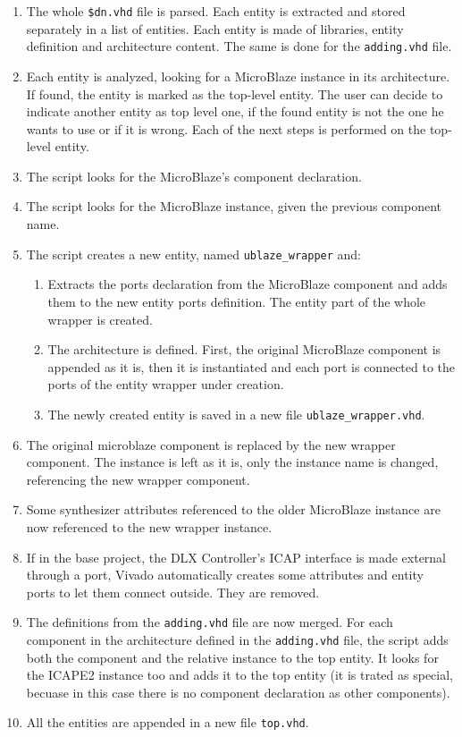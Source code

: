 \begin{enumerate}
    \item The whole \texttt{\$dn.vhd} file is parsed. Each entity is extracted and stored separately in a list of entities. Each entity is made of libraries, entity definition and architecture content. The same is done for the \texttt{adding.vhd} file.
    \item Each entity is analyzed, looking for a MicroBlaze instance in its architecture. If found, the entity is marked as the top-level entity. The user can decide to indicate another entity as top level one, if the found entity is not the one he wants to use or if it is wrong. Each of the next steps is performed on the top-level entity.
    \item The script looks for the MicroBlaze's component declaration. 
    \item The script looks for the MicroBlaze instance, given the previous component name.
    \item The script creates a new entity, named \texttt{ublaze\_wrapper} and:
        \begin{enumerate}
        \item Extracts the ports declaration from the MicroBlaze component and adds them to the new entity ports definition. The entity part of the whole wrapper is created.
        \item The architecture is defined. First, the original MicroBlaze component is appended as it is, then it is instantiated and each port is connected to the ports of the entity wrapper under creation.
        \item The newly created entity is saved in a new file \texttt{ublaze\_wrapper.vhd}.
        \end{enumerate}
    \item The original microblaze component is replaced by the new wrapper component. The instance is left as it is, only the instance name is changed, referencing the new wrapper component.
    \item Some synthesizer attributes referenced to the older MicroBlaze instance are now referenced to the new wrapper instance.
    \item If in the base project, the DLX Controller's ICAP interface is made external through a port, Vivado automatically creates some attributes and entity ports to let them connect outside. They are removed.
    \item The definitions from the \texttt{adding.vhd} file are now merged. For each component in the architecture defined in the \texttt{adding.vhd} file, the script adds both the component and the relative instance to the top entity. It looks for the ICAPE2 instance too and adds it to the top entity (it is trated as special, becuase in this case there is no component declaration as other components).
    \item All the entities are appended in a new file \texttt{top.vhd}.
\end{enumerate}

